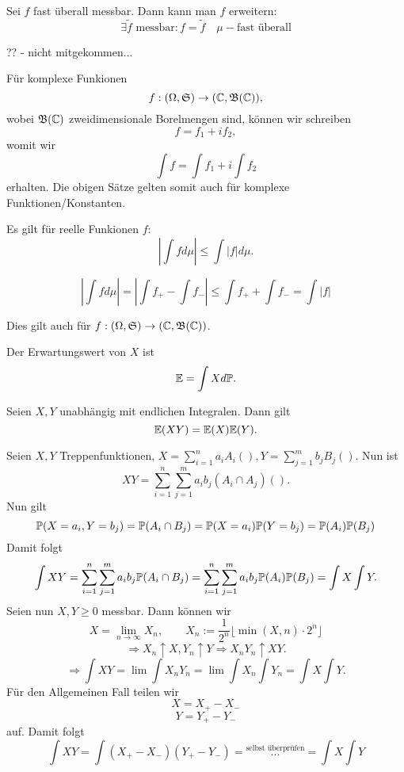 			\begin{satz}
				Sei $f$ fast überall messbar. Dann kann man $f$ erweitern:
				\[ \exists \tilde{f}\text{ messbar}: f=\tilde{f}\quad\mu-\text{fast überall} \]
			\end{satz}
				
			\begin{bew}
				?? - nicht mitgekommen...
			\end{bew}
			
			\begin{bem}
				Für komplexe Funkionen
				\[ f: (\Omega, \mf{S})\to(\C, \mf{B}(\C)), \]
				wobei $\mf{B}(\C)$ zweidimensionale Borelmengen sind, können wir schreiben
				\[ f=f_1+if_2, \]
				womit wir
				\[ \int f=\int f_1+i\int f_2 \]
				erhalten. Die obigen Sätze gelten somit auch für komplexe Funktionen/Konstanten. 
			\end{bem}
			
			\begin{satz}
				Es gilt für reelle Funkionen $f$:
				\[ \left|\int fd\mu\right|\le \int |f|d\mu. \]
			\end{satz}
			
			\begin{bew}
				\[ \left|\int fd\mu\right|=\left|\int f_+-\int f_-\right|\le \int f_++\int f_-=\int |f| \]
			\end{bew}
			
			\begin{bem}
				Dies gilt auch für $f:(\Omega,\mf{S})\to(\C,\mf{B}(\C))$. 
			\end{bem}
			
			\begin{defi}
				Der Erwartungswert von $X$ ist
				\[ \mathbb{E}=\int X d\P. \]
			\end{defi}
			
			\begin{satz}
				Seien $X,Y$ unabhängig mit endlichen Integralen. Dann gilt
				\[ \E(X Y)=\E(X)\E(Y). \]
			\end{satz}
			
			\begin{bew}
				Seien $X,Y$ Treppenfunktionen, $X=\sum_{i=1}^n a_i A_i(), Y=\sum_{j=1}^{m}b_j B_j()$. Nun ist
				\[ XY=\sum_{i=1}^{n}\sum_{j=1}^{m}a_ib_j(A_i\cap A_j)(). \]
				Nun gilt
				\[ \P(X=a_i, Y=b_j)=\P(A_i\cap B_j)=\P(X=a_i)\P(Y=b_j)=\P(A_i)\P(B_j) \]
				Damit folgt
				\[ \int XY=\sum_{i=1}^n\sum_{j=1}^m a_ib_j\P(A_i\cap B_j)=\sum_{i=1}^{n}\sum_{j=1}^{m}a_ib_j\P(A_i)\P(B_j)=\int X\int Y. \]
				Seien nun $X,Y\ge 0$ messbar. Dann können wir 
				\[ X=\lim_{n\to\infty} X_n,\qquad X_n:=\frac{1}{2^n}\lfloor\min(X,n)\cdot 2^n\rfloor \]
				\[ \Rightarrow X_n\uparrow X, Y_n\uparrow Y\Rightarrow X_nY_n\uparrow XY. \]
				\[ \Rightarrow \int XY=\lim\int X_nY_n=\lim \int X_n\int Y_n=\int X\int Y. \]
				Für den Allgemeinen Fall teilen wir 
				\[ X=X_+-X_- \]
				\[ Y=Y_+-Y_- \]
				auf. Damit folgt
				\[ \int XY=\int (X_+-X_-)(Y_+-Y_-)=\stackrel{\text{selbst überprüfen}}{...}=\int X\int Y \]
			\end{bew}
			
